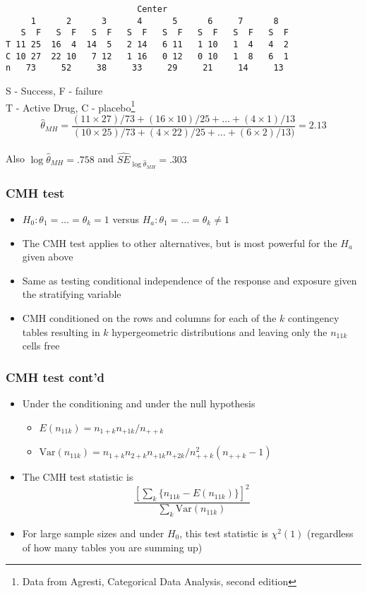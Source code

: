 \documentclass[aspectratio=169]{beamer}
\newcommand{\Var}{\mathrm{Var}}
\begin{document}
\begin{frame}[fragile]
\ttfamily\small
\begin{verbatim}
                          Center
     1      2      3      4      5      6     7      8
   S  F   S  F   S  F   S  F   S  F   S  F   S  F   S  F
T 11 25  16  4  14  5   2 14   6 11   1 10   1  4   4  2
C 10 27  22 10   7 12   1 16   0 12   0 10   1  8   6  1
n   73     52     38     33     29     21     14     13
\end{verbatim}
S - Success, F - failure \\
T - Active Drug,  C - placebo\footnote{Data from Agresti, Categorical Data Analysis, second edition}
\normalfont \\
$$
\hat \theta_{MH} = 
\frac{(11 \times 27) / 73 + (16 \times 10)/25 + \ldots + (4\times 1)/13}
{(10 \times 25) / 73 + (4 \times 22) / 25 + \ldots + (6 \times 2 ) / 13)} = 2.13
$$ \\
Also $\log\hat\theta_{MH} = .758$ and $\hat{SE}_{\log \hat\theta_{MH}} = .303$
\end{frame}

\begin{frame}\frametitle{CMH test}
\begin{itemize}
\item $H_0:\theta_1=\ldots=\theta_k = 1$ versus $H_a:\theta_1=\ldots=\theta_k \neq 1$
\item The CMH test applies to other alternatives, but is most powerful for the
  $H_a$ given above
\item Same as testing conditional independence of the response and exposure given the
  stratifying variable
\item CMH conditioned on the rows and columns for each of the $k$ contingency tables
  resulting in $k$ hypergeometric distributions and leaving only the $n_{11k}$ cells
  free
\end{itemize}
\end{frame}

\begin{frame}\frametitle{CMH test cont'd}
\begin{itemize}
\item Under the conditioning and under the null hypothesis 
  \begin{itemize} 
  \item $E(n_{11k})  = n_{1+k}n_{+1k}/n_{++k}$
  \item $\Var(n_{11k}) = n_{1+k}n_{2+k}n_{+1k}n_{+2k}/n_{++k}^2(n_{++k} - 1)$ 
  \end{itemize}
\item The CMH test statistic is 
  $$
  \frac{[\sum_k \{n_{11k} - E(n_{11k})\}]^2}{\sum_k \Var(n_{11k})}
  $$ 
\item For large sample sizes and under $H_0$, this test statistic is $\chi^2(1)$ (regardless
  of how many tables you are summing up)
\end{itemize}
\end{frame}
\end{document}
